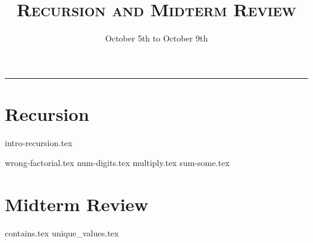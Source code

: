 \documentclass{exam}
\title{\textsc{Recursion and Midterm Review}}
\date{October 5th to October 9th}
\begin{document}
\maketitle
\rule{\textwidth}{0.15em}
\fontsize{12}{15}\selectfont


\section{Recursion}
{intro-recursion.tex}
\begin{questions}
\newpage
{wrong-factorial.tex}
{num-digits.tex}
\newpage
{multiply.tex}
{sum-some.tex}
\newpage
\section{Midterm Review}
{contains.tex}
\newpage
{unique_values.tex}



\end{questions}
\end{document}

